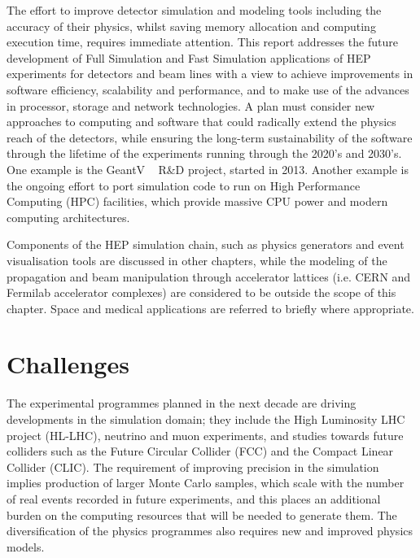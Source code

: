 \documentclass[12pt,a4paper]{article}
\begin{document}
The effort to improve detector simulation and modeling tools including
the accuracy of their physics, whilst saving memory allocation and
computing execution time, requires immediate attention. This report
addresses the future development of Full Simulation and Fast Simulation
applications of HEP experiments for detectors and beam lines with a view
to achieve improvements in software efficiency, scalability and
performance, and to make use of the advances in processor, storage and
network technologies. A plan must consider new approaches to computing
and software that could radically extend the physics reach of the
detectors, while ensuring the long-term sustainability of the software
through the lifetime of the experiments running through the 2020's and
2030's. One example is the GeantV ~\cite{1742-6596-396-2-022014} R\&D project, started in 2013.
Another example is the ongoing effort to port simulation code to run on
High Performance Computing (HPC) facilities, which provide massive CPU
power and modern computing architectures.

Components of the HEP simulation chain, such as physics generators and
event visualisation tools are discussed in other chapters, while the
modeling of the propagation and beam manipulation through accelerator
lattices (i.e. CERN and Fermilab accelerator complexes) are considered
to be outside the scope of this chapter. Space and medical applications
are referred to briefly where appropriate.


\hypertarget{challenges}{%
\section{Challenges}\label{challenges}}

The experimental programmes planned in the next decade are driving
developments in the simulation domain; they include the High Luminosity
LHC project (HL-LHC), neutrino and muon experiments, and studies towards
future colliders such as the Future Circular Collider (FCC) and the
Compact Linear Collider (CLIC). The requirement of improving precision
in the simulation implies production of larger Monte Carlo samples,
which scale with the number of real events recorded in future
experiments, and this places an additional burden on the computing
resources that will be needed to generate them. The diversification of
the physics programmes also requires new and improved physics models.
\end{document}
